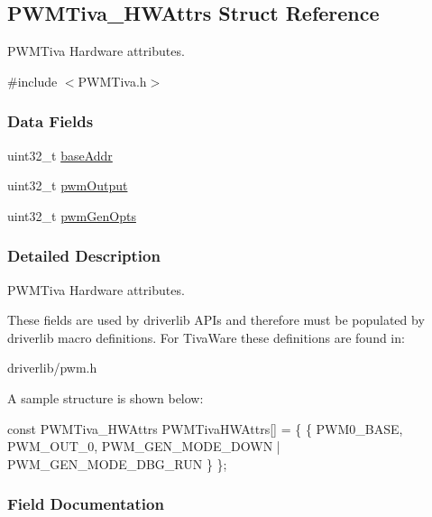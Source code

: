 \subsection{P\+W\+M\+Tiva\+\_\+\+H\+W\+Attrs Struct Reference}
\label{struct_p_w_m_tiva___h_w_attrs}


P\+W\+M\+Tiva Hardware attributes.  




{\ttfamily \#include $<$P\+W\+M\+Tiva.\+h$>$}

\subsubsection*{Data Fields}
\begin{DoxyCompactItemize}
\item 
uint32\+\_\+t \hyperlink{struct_p_w_m_tiva___h_w_attrs_a12270fd5eca318763aab674472954692}{base\+Addr}
\item 
uint32\+\_\+t \hyperlink{struct_p_w_m_tiva___h_w_attrs_a125b0d4868fff9b2e30624fbbdc67df9}{pwm\+Output}
\item 
uint32\+\_\+t \hyperlink{struct_p_w_m_tiva___h_w_attrs_a000c25643c0e7aff1422a6a7b812193f}{pwm\+Gen\+Opts}
\end{DoxyCompactItemize}


\subsubsection{Detailed Description}
P\+W\+M\+Tiva Hardware attributes. 

These fields are used by driverlib A\+P\+Is and therefore must be populated by driverlib macro definitions. For Tiva\+Ware these definitions are found in\+:
\begin{DoxyItemize}
\item driverlib/pwm.\+h
\end{DoxyItemize}

A sample structure is shown below\+: 
\begin{DoxyCode}
\textcolor{keyword}{const} PWMTiva_HWAttrs PWMTivaHWAttrs[] = \{
    \{
        PWM0\_BASE,
        PWM\_OUT\_0,
        PWM\_GEN\_MODE\_DOWN | PWM\_GEN\_MODE\_DBG\_RUN
    \}
\};
\end{DoxyCode}
 

\subsubsection{Field Documentation}
